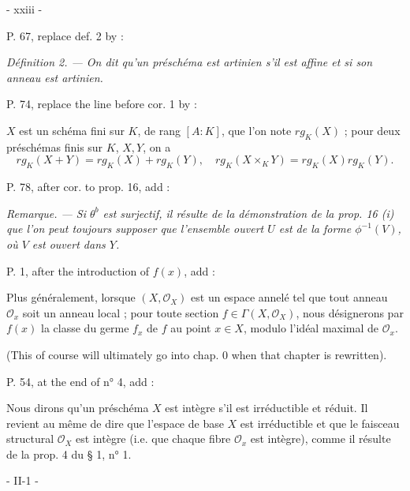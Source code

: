 \newpage


- xxiii -

P. 67, replace def. 2 by :

\emph{Définition 2. — On dit qu'un préschéma est artinien s'il est affine et si son anneau est artinien.}

P. 74, replace the line before cor. 1 by :

$X$ est un schéma fini sur $K$, de rang $[A:K]$, que l'on note $rg_K(X)$ ; pour deux préschémas finis sur $K$, $X, Y$, on a 
$$rg_K(X+Y) = rg_K(X) + rg_K(Y), \quad rg_K(X \times_K Y) = rg_K(X) rg_K(Y).$$

P. 78, after cor. to prop. 16, add :

\emph{Remarque. — Si $\theta^b$ est surjectif, il résulte de la démonstration de la prop. 16 (i) que l'on peut toujours supposer que l'ensemble ouvert $U$ est de la forme $\phi^{-1}(V)$, où $V$ est ouvert dans $Y$.}

P. 1, after the introduction of $f(x)$, add :

Plus généralement, lorsque $(X, \mathcal{O}_X)$ est un espace annelé tel que tout anneau $\mathcal{O}_x$ soit un anneau local ; pour toute section $f \in \Gamma(X, \mathcal{O}_X)$, nous désignerons par $f(x)$ la classe du germe $f_x$ de $f$ au point $x \in X$, modulo l'idéal maximal de $\mathcal{O}_x$.

(This of course will ultimately go into chap. 0 when that chapter is rewritten).

P. 54, at the end of n° 4, add :

Nous dirons qu'un préschéma $X$ est intègre s'il est irréductible et réduit. Il revient au même de dire que l'espace de base $X$ est irréductible et que le faisceau structural $\mathcal{O}_X$ est intègre (i.e. que chaque fibre $\mathcal{O}_x$ est intègre), comme il résulte de la prop. 4 du § 1, n° 1.

\newpage


- II-1 -

